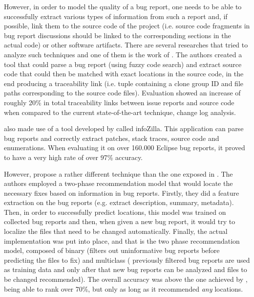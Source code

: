 \documentclass{mprop}
\begin{document}
However, in order to model the quality of a bug report, one needs to be able to
successfully extract various types of information from such a report and, if 
possible, link them to the source code of the project (i.e. source code fragments
in bug report discussions should be linked to the corresponding sections in the 
actual code) or other software artifacts. There are several researches that tried 
to analyze such techniques and one of them is the work of 
\citet{bettenburg2012using}. The authors created a tool that could parse a bug 
report (using fuzzy code search) and extract source code that could then be
matched with exact locations in the source code, in the end producing a 
traceability link (i.e. tuple containing a clone group ID and file paths 
corresponding to the source code files). Evaluation showed an increase of
roughly 20\% in total traceability links between issue reports and source code 
when compared to the current state-of-the-art technique, change log analysis.

\citet{bettenburg2012using} also made use of a tool developed by 
\citet{bettenburg2008extracting} called infoZilla. This application can
parse bug reports and correctly extract patches, stack traces, source code and
enumerations. When evaluating it on over 160.000 Eclipse bug reports, it proved to 
have a very high rate of over 97\% accuracy.

However, \citet{kim2013should} propose a rather different technique than the one
exposed in \citet{bettenburg2012using}. The authors employed a two-phase
recommendation model that would locate the necessary fixes based on information
in bug reports. Firstly, they did a feature extraction on the bug reports (e.g. 
extract description, summary, metadata). Then, in order to successfully predict
locations, this model was trained on collected bug reports and then, when given
a new bug report, it would try to localize the files that need to be changed 
automatically. Finally, the actual implementation was put into place, and that
is the two phase recommendation model, composed of binary (filters out 
uninformative bug reports before predicting the files to fix) and multiclass (
previously filtered bug reports are used as training data and only after that
new bug reports can be analyzed and files to be changed recommended). The 
overall accuracy was above the one achieved by \citet{bettenburg2012using}, 
being able to rank over 70\%, but only as long as it recommended \emph{any} 
locations.
\end{document}
